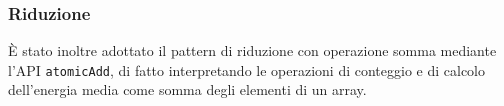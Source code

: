 \subsubsection{Riduzione}

È stato inoltre adottato il pattern di riduzione con operazione somma mediante
l'API \texttt{atomicAdd}, di fatto interpretando le operazioni di conteggio e di
calcolo dell'energia media come somma degli elementi di un array.

